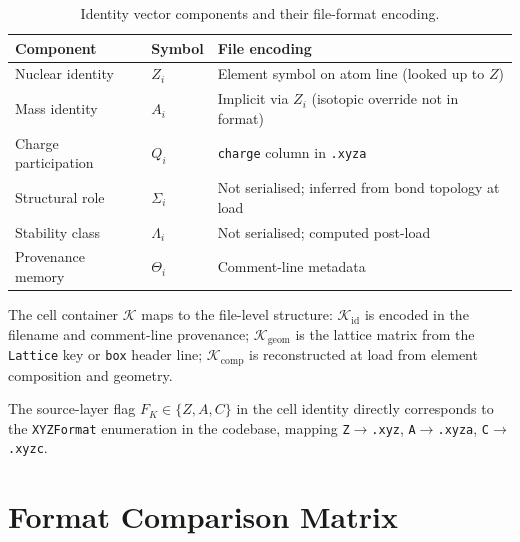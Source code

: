 \documentclass[12pt, a4paper, oneside]{article}
\newcommand{\type}[1]{\texttt{#1}}
\begin{document}
\begin{table}[htbp]
  \centering
  \caption{Identity vector components and their file-format encoding.}
  \label{tab:s0_map}
  \begin{tabular}{llp{6.5cm}}
    \toprule
    Component & Symbol & File encoding \\
    \midrule
    Nuclear identity  & $Z_i$      & Element symbol on atom line
                                      (looked up to $Z$) \\
    Mass identity     & $A_i$      & Implicit via $Z_i$
                                      (isotopic override not in format) \\
    Charge participation & $Q_i$   & \texttt{charge} column in
                                      \texttt{.xyza} \\
    Structural role   & $\Sigma_i$ & Not serialised; inferred from
                                      bond topology at load \\
    Stability class   & $\Lambda_i$& Not serialised; computed
                                      post-load \\
    Provenance memory & $\Theta_i$ & Comment-line metadata \\
    \bottomrule
  \end{tabular}
\end{table}

The cell container $\mathcal{K}$ maps to the file-level structure:
$\mathcal{K}_{\text{id}}$ is encoded in the filename and comment-line
provenance; $\mathcal{K}_{\text{geom}}$ is the lattice matrix from
the \texttt{Lattice} key or \texttt{box} header line;
$\mathcal{K}_{\text{comp}}$ is reconstructed at load from element
composition and geometry.

The source-layer flag $F_K \in \{Z, A, C\}$ in the cell identity
directly corresponds to the \type{XYZFormat} enumeration in the
codebase, mapping \texttt{Z}$\to$\texttt{.xyz},
\texttt{A}$\to$\texttt{.xyza}, \texttt{C}$\to$\texttt{.xyzc}.

\section{Format Comparison Matrix}
\label{sec:matrix}
\end{document}
